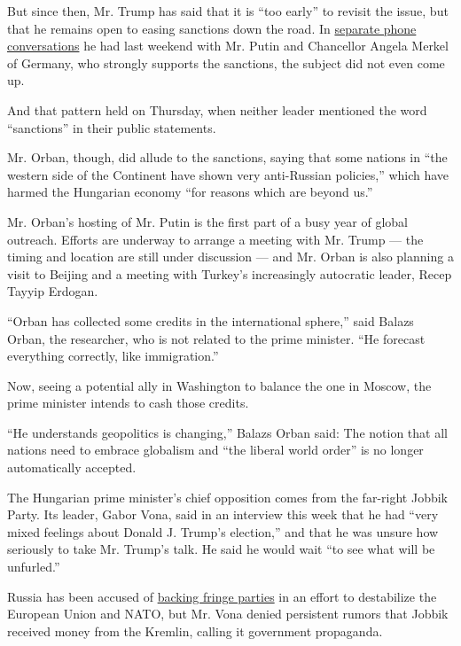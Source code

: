 But since then, Mr. Trump has said that it is ``too early'' to revisit
the issue, but that he remains open to easing sanctions down the road.
In
\href{https://www.nytimes.com/2017/01/28/us/politics/trump-putin-russia-sanctions.html}{separate
phone conversations} he had last weekend with Mr. Putin and Chancellor
Angela Merkel of Germany, who strongly supports the sanctions, the
subject did not even come up.

And that pattern held on Thursday, when neither leader mentioned the
word ``sanctions'' in their public statements.

Mr. Orban, though, did allude to the sanctions, saying that some nations
in ``the western side of the Continent have shown very anti-Russian
policies,'' which have harmed the Hungarian economy ``for reasons which
are beyond us.''

Mr. Orban's hosting of Mr. Putin is the first part of a busy year of
global outreach. Efforts are underway to arrange a meeting with Mr.
Trump --- the timing and location are still under discussion --- and Mr.
Orban is also planning a visit to Beijing and a meeting with Turkey's
increasingly autocratic leader, Recep Tayyip Erdogan.

``Orban has collected some credits in the international sphere,'' said
Balazs Orban, the researcher, who is not related to the prime minister.
``He forecast everything correctly, like immigration.''

Now, seeing a potential ally in Washington to balance the one in Moscow,
the prime minister intends to cash those credits.

``He understands geopolitics is changing,'' Balazs Orban said: The
notion that all nations need to embrace globalism and ``the liberal
world order'' is no longer automatically accepted.

The Hungarian prime minister's chief opposition comes from the far-right
Jobbik Party. Its leader, Gabor Vona, said in an interview this week
that he had ``very mixed feelings about Donald J. Trump's election,''
and that he was unsure how seriously to take Mr. Trump's talk. He said
he would wait ``to see what will be unfurled.''

Russia has been accused of
\href{https://www.nytimes.com/2016/12/24/world/europe/intent-on-unsettling-eu-russia-taps-foot-soldiers-from-the-fringe.html}{backing
fringe parties} in an effort to destabilize the European Union and NATO,
but Mr. Vona denied persistent rumors that Jobbik received money from
the Kremlin, calling it government propaganda.

